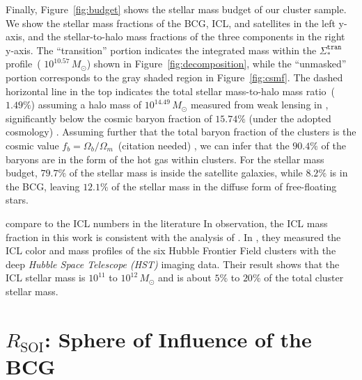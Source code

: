 \documentclass[fleqn,usenatbib]{mnras}
\newcommand{\rsoi}{R_{\mathrm{SOI}}}
\newcommand{\sigtr}{\Sigma_*^{\texttt{tran}}}
\newcommand{\msol}{M_{\odot}}
\newcommand\ying[1]{{\color{red} {#1}}}
\newcommand\xkchen[1]{{\color{cyan} {#1}}}
\newcommand*\citeme{{\color{green}(citation needed)}}
\begin{document}
Finally, Figure~\ref{fig:budget} shows the stellar mass budget of our
cluster sample. We show the stellar mass fractions of the BCG, ICL, and
satellites in the left y-axis, and the stellar-to-halo mass fractions of
the three components in the right y-axis.  The ``transition'' portion
indicates the integrated mass within the $\sigtr$ profile~(\xkchen{$10^{10.57}\,\msol$})
shown in Figure~\ref{fig:decomposition}, while the ``unmasked'' portion
corresponds to the gray shaded region in Figure~\ref{fig:csmf}. The dashed
horizontal line in the top indicates the
total stellar mass-to-halo mass ratio~(\xkchen{$1.49\%$}) assuming a halo mass of \xkchen{$10^{14.49}\,\msol$}
measured from weak lensing in , significantly below the
cosmic baryon fraction of \xkchen{$15.74\%$ (under the adopted cosmology) }. Assuming further that the total baryon fraction of the clusters is the cosmic value \xkchen{$f_{b}=\Omega_{b} / \Omega_{m}$}~\citeme \xkchen{\citep{PlanckCollaboration2016} }, we can infer
that the \xkchen{$90.4\%$} of the baryons are in the form of the hot gas within
clusters.  For the stellar mass budget, \xkchen{$79.7\%$} of the stellar mass is
inside the satellite galaxies, while \xkchen{$8.2\%$} is in the BCG, leaving
\xkchen{$12.1\%$} of the stellar mass in the diffuse form of free-floating stars.

\ying{compare to the ICL numbers in the literature}
\xkchen{In observation, the ICL mass fraction in this work is consistent with the analysis of \citep{Morishita2017}. In \citep{Morishita2017}, they measured the ICL color and mass profiles of the six Hubble Frontier Field clusters with the deep \textit{Hubble Space Telescope (HST)} imaging data. Their result shows that the ICL stellar mass is $10^{11}$ to $10^{12}\,M_{\odot}$ and is about $5\%$ to $20\%$ of the total cluster stellar mass.}



\section{\texorpdfstring{$\rsoi$}{Rsoi}: Sphere of Influence of the BCG}
\label{sec:soi}
\end{document}
